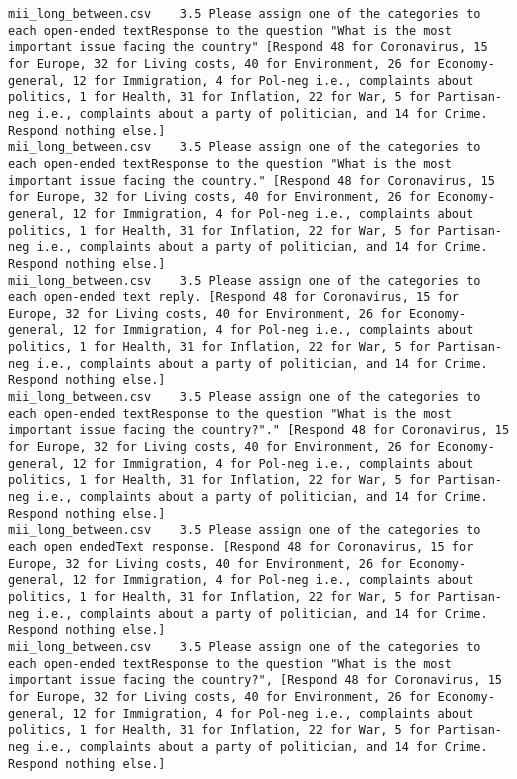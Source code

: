 \begin{lstlisting}
mii_long_between.csv	3.5	Please assign one of the categories to each open-ended textResponse to the question "What is the most important issue facing the country" [Respond 48 for Coronavirus, 15 for Europe, 32 for Living costs, 40 for Environment, 26 for Economy-general, 12 for Immigration, 4 for Pol-neg i.e., complaints about politics, 1 for Health, 31 for Inflation, 22 for War, 5 for Partisan-neg i.e., complaints about a party of politician, and 14 for Crime. Respond nothing else.]
mii_long_between.csv	3.5	Please assign one of the categories to each open-ended textResponse to the question "What is the most important issue facing the country." [Respond 48 for Coronavirus, 15 for Europe, 32 for Living costs, 40 for Environment, 26 for Economy-general, 12 for Immigration, 4 for Pol-neg i.e., complaints about politics, 1 for Health, 31 for Inflation, 22 for War, 5 for Partisan-neg i.e., complaints about a party of politician, and 14 for Crime. Respond nothing else.]
mii_long_between.csv	3.5	Please assign one of the categories to each open-ended text reply. [Respond 48 for Coronavirus, 15 for Europe, 32 for Living costs, 40 for Environment, 26 for Economy-general, 12 for Immigration, 4 for Pol-neg i.e., complaints about politics, 1 for Health, 31 for Inflation, 22 for War, 5 for Partisan-neg i.e., complaints about a party of politician, and 14 for Crime. Respond nothing else.]
mii_long_between.csv	3.5	Please assign one of the categories to each open-ended textResponse to the question "What is the most important issue facing the country?"." [Respond 48 for Coronavirus, 15 for Europe, 32 for Living costs, 40 for Environment, 26 for Economy-general, 12 for Immigration, 4 for Pol-neg i.e., complaints about politics, 1 for Health, 31 for Inflation, 22 for War, 5 for Partisan-neg i.e., complaints about a party of politician, and 14 for Crime. Respond nothing else.]
mii_long_between.csv	3.5	Please assign one of the categories to each open endedText response. [Respond 48 for Coronavirus, 15 for Europe, 32 for Living costs, 40 for Environment, 26 for Economy-general, 12 for Immigration, 4 for Pol-neg i.e., complaints about politics, 1 for Health, 31 for Inflation, 22 for War, 5 for Partisan-neg i.e., complaints about a party of politician, and 14 for Crime. Respond nothing else.]
mii_long_between.csv	3.5	Please assign one of the categories to each open-ended textResponse to the question "What is the most important issue facing the country?", [Respond 48 for Coronavirus, 15 for Europe, 32 for Living costs, 40 for Environment, 26 for Economy-general, 12 for Immigration, 4 for Pol-neg i.e., complaints about politics, 1 for Health, 31 for Inflation, 22 for War, 5 for Partisan-neg i.e., complaints about a party of politician, and 14 for Crime. Respond nothing else.]

\end{lstlisting}
